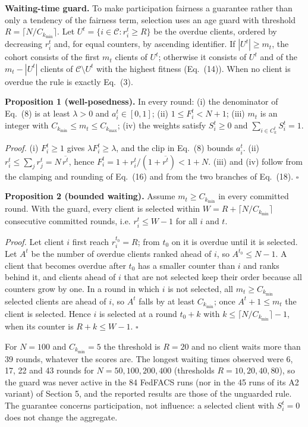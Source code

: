 \documentclass[pdflatex,sn-mathphys-num,oneside]{sn-jnl}%
\theoremstyle{thmstyleone}%
\theoremstyle{thmstyletwo}%
\theoremstyle{thmstylethree}%
\begin{document}
\textbf{Waiting-time guard.} To make participation fairness a guarantee rather than only a tendency of the fairness term, selection uses an age guard with threshold $R=\lceil N/C_{k_{\min}}\rceil$. Let $U^t=\{i\in\mathcal{C}: r_i^t\ge R\}$ be the overdue clients, ordered by decreasing $r_i^t$ and, for equal counters, by ascending identifier. If $|U^t|\ge m_t$, the cohort consists of the first $m_t$ clients of $U^t$; otherwise it consists of $U^t$ and of the $m_t-|U^t|$ clients of $\mathcal{C}\setminus U^t$ with the highest fitness (Eq.~(14)). When no client is overdue the rule is exactly Eq.~(3).

\textbf{Proposition 1 (well-posedness).} In every round: (i) the denominator of Eq.~(8) is at least $\lambda>0$ and $a_i^t\in[0,1]$; (ii) $1\le F_i^t<N+1$; (iii) $m_t$ is an integer with $C_{k_{\min}}\le m_t\le C_{k_{\max}}$; (iv) the weights satisfy $S_i^t\ge 0$ and $\sum_{i\in C_k^t}S_i^t=1$.

\textit{Proof.} (i) $F_i^t\ge 1$ gives $\lambda F_i^t\ge\lambda$, and the clip in Eq.~(8) bounds $a_i^t$. (ii) $r_i^t\le\sum_j r_j^t=N\,\overline{r^t}$, hence $F_i^t=1+r_i^t/(1+\overline{r^t})<1+N$. (iii) and (iv) follow from the clamping and rounding of Eq.~(16) and from the two branches of Eq.~(18). \hfill$\square$

\textbf{Proposition 2 (bounded waiting).} Assume $m_t\ge C_{k_{\min}}$ in every committed round. With the guard, every client is selected within $W=R+\lceil N/C_{k_{\min}}\rceil$ consecutive committed rounds, i.e. $r_i^t\le W-1$ for all $i$ and $t$.

\textit{Proof.} Let client $i$ first reach $r_i^{t_0}=R$; from $t_0$ on it is overdue until it is selected. Let $A^t$ be the number of overdue clients ranked ahead of $i$, so $A^{t_0}\le N-1$. A client that becomes overdue after $t_0$ has a smaller counter than $i$ and ranks behind it, and clients ahead of $i$ that are not selected keep their order because all counters grow by one. In a round in which $i$ is not selected, all $m_t\ge C_{k_{\min}}$ selected clients are ahead of $i$, so $A^t$ falls by at least $C_{k_{\min}}$; once $A^t+1\le m_t$ the client is selected. Hence $i$ is selected at a round $t_0+k$ with $k\le\lceil N/C_{k_{\min}}\rceil-1$, when its counter is $R+k\le W-1$. \hfill$\square$

For $N=100$ and $C_{k_{\min}}=5$ the threshold is $R=20$ and no client waits more than 39 rounds, whatever the scores are. The longest waiting times observed were 6, 17, 22 and 43 rounds for $N=50,100,200,400$ (thresholds $R=10,20,40,80$), so the guard was never active in the 84 FedFACS runs (nor in the 45 runs of its A2 variant) of Section 5, and the reported results are those of the unguarded rule. The guarantee concerns participation, not influence: a selected client with $S_i^t=0$ does not change the aggregate.
\end{document}

